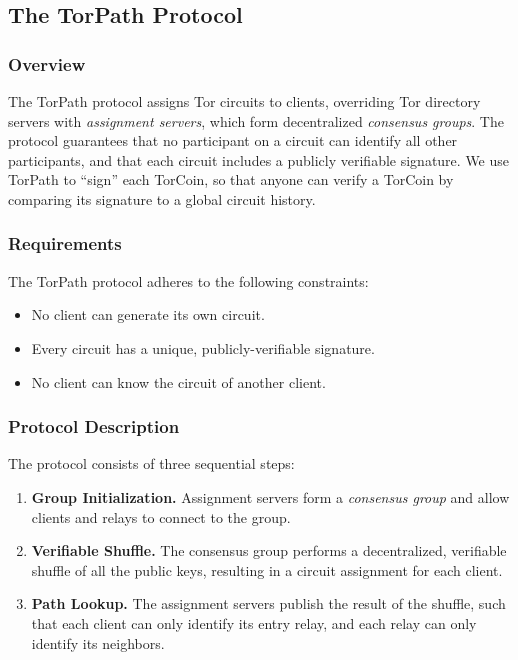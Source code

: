 \subsection{The TorPath Protocol}

\subsubsection{Overview}

The TorPath protocol assigns Tor circuits to clients, overriding Tor directory
servers with \textit{assignment servers}, which form decentralized
\textit{consensus groups}. The protocol guarantees that no participant on a
circuit can identify all other participants, and that each circuit includes a
publicly verifiable signature. We use TorPath to ``sign'' each TorCoin, so
that anyone can verify a TorCoin by comparing its signature to a
global circuit history.

\subsubsection{Requirements}

The TorPath protocol adheres to the following constraints:

\begin{itemize}   
\item No client can generate its own circuit.
\item Every circuit has a unique, publicly-verifiable signature.
\item No client can know the circuit of another client.
\end{itemize}

\subsubsection{Protocol Description}

The protocol consists of three sequential steps:

\begin{enumerate}
\item \textbf{Group Initialization.} Assignment servers form a \textit{consensus group} and allow clients and relays to connect to the group. 
\item \textbf{Verifiable Shuffle.} The consensus group performs a decentralized, 
verifiable shuffle of all the public keys, resulting in a circuit assignment for
each client.
\item \textbf{Path Lookup.} The assignment servers publish the result of the 
shuffle, such that each client can only identify its entry relay, and each relay
can only identify its neighbors. 
\end{enumerate}


